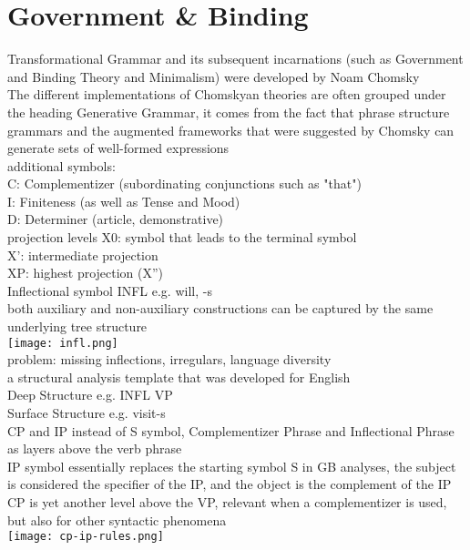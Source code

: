 \section{Government \& Binding}
{\tiny Transformational Grammar and its subsequent incarnations (such as
Government and Binding Theory and Minimalism) were developed by
Noam Chomsky}\\
{\tiny The different implementations of Chomskyan theories are often grouped under the heading Generative Grammar, it comes from the fact that phrase structure grammars and the augmented frameworks that were suggested by Chomsky can generate sets of well-formed expressions }\\
\scriptsize{additional symbols:}\\ {\tiny C: Complementizer (subordinating conjunctions such as "that")\\
I: Finiteness (as well as Tense and Mood)\\
D: Determiner (article, demonstrative)
}\\
\scriptsize{projection levels} {\tiny X0: symbol that leads to the terminal symbol\\
X': intermediate projection \\
XP: highest projection (X'')
}\\
\scriptsize{Inflectional symbol INFL} {\tiny e.g. will, -s \\
both auxiliary and non-auxiliary constructions can be captured by the same underlying tree structure\\
\texttt{[image: infl.png]}\\
problem: missing inflections, irregulars, language diversity\\
a structural analysis template that was developed for English}\\
\scriptsize{Deep Structure} {\tiny e.g. INFL VP}\\
\scriptsize{Surface Structure} 
{\tiny e.g. visit-s}\\
\scriptsize{CP and IP} 
{\tiny instead of S symbol, Complementizer Phrase and Inflectional Phrase as layers above the verb phrase\\
IP symbol essentially replaces the starting symbol S in GB analyses, the subject is considered the specifier of the IP, and the object is the complement of the IP\\
CP is yet another level above the VP, relevant when a complementizer is used, but also for other syntactic phenomena}\\
\texttt{[image: cp-ip-rules.png]}\\
